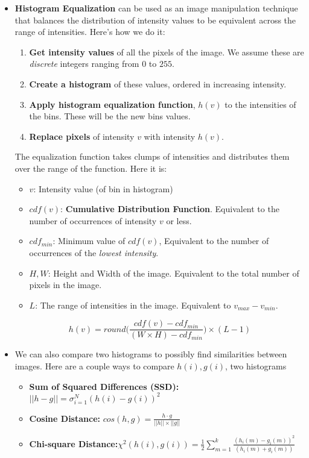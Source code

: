 \documentclass{article}
\begin{document}
\begin{itemize}
    \item \textbf{Histogram Equalization} can be used as an image manipulation technique that balances the distribution of intensity values to be equivalent across the range of intensities. Here's how we do it:
    \begin{enumerate}
        \item \textbf{Get intensity values} of all the pixels of the image. We assume these are \textit{discrete} integers ranging from $0$ to $255$.
        \item \textbf{Create a histogram} of these values, ordered in increasing intensity.
        \item \textbf{Apply histogram equalization function}, $h(v)$ to the intensities of the bins. These will be the new bins values.
        \item \textbf{Replace pixels} of intensity $v$ with intensity $h(v)$.
    \end{enumerate}
    The equalization function takes clumps of intensities and distributes them over the range of the function. Here it is:
    \begin{itemize}
        \item $v$: Intensity value (of bin in histogram)
        \item $cdf(v)$:  \textbf{Cumulative Distribution Function}. Equivalent to the number of occurrences of intensity $v$ or less.
        \item $cdf_{min}$: Minimum value of $cdf(v)$, Equivalent to the number of occurrences of the \textit{lowest intensity}.
        \item $H,W$: Height and Width of the image. Equivalent to the total number of pixels in the image. 
        \item $L$: The range of intensities in the image. Equivalent to $v_{max} - v_{min}$.
    \end{itemize}
    $$h(v) = round\bigg(\frac{cdf(v) - cdf_{min}}{(W\times H) - cdf_{min}}\bigg)\times (L-1)$$
    \item We can also compare two histograms to possibly find similarities between images. Here are a couple ways to compare $h(i),g(i)$, two histograms
    \begin{itemize}
        \item \textbf{Sum of Squared Differences (SSD):}$||h-g|| = \sigma^N_{i=1}(h(i)-g(i))^2$
        \item \textbf{Cosine Distance:} $cos(h,g) = \frac{h \cdot g}{||h|| \times ||g||}$
        \item \textbf{Chi-square Distance:}$\chi^2(h(i),g(i)) = \frac{1}{2}\sum^k_{m=1} \frac{(h_i(m) - g_i(m))^2}{(h_i(m) + g_i(m))}$
    \end{itemize}
\end{itemize}
\end{document}
